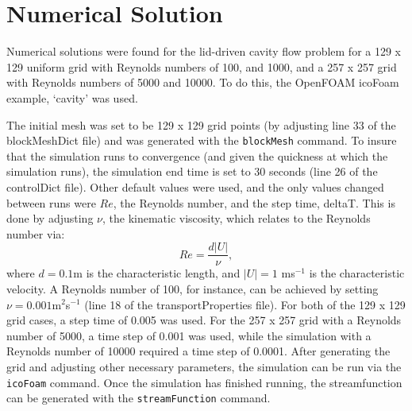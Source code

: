 \documentclass[twocolumn,10pt]{asme2ej}
\begin{document}
\section{Numerical Solution}
Numerical solutions were found for the lid-driven cavity flow problem for a 129 x 129 uniform grid with Reynolds numbers of 100, and 1000, and a 257 x 257 grid with Reynolds numbers of 5000 and 10000. To do this, the OpenFOAM icoFoam example, `cavity' was used.

The initial mesh was set to be 129 x 129 grid points (by adjusting line 33 of the blockMeshDict file) and was generated with the \lstinline[language=sh]`blockMesh` command. To insure that the simulation runs to convergence (and given the quickness at which the simulation runs), the simulation end time is set to 30 seconds (line 26 of the controlDict file). Other default values were used, and the only values changed between runs were $Re$, the Reynolds number, and the step time, deltaT. This is done by adjusting $\nu$, the kinematic viscosity, which relates to the Reynolds number via:
\begin{equation}
Re = \frac{d|U|}{\nu},
\end{equation}
where $d = 0.1$m is the characteristic length, and $|U| = 1$ ms$^{-1}$ is the characteristic velocity. A Reynolds number of 100, for instance, can be achieved by setting $\nu = 0.001$m$^2$s$^{-1}$ (line 18 of the transportProperties file). For both of the 129 x 129 grid cases, a step time of 0.005 was used. For the 257 x 257 grid with a Reynolds number of 5000, a time step of 0.001 was used, while the simulation with a Reynolds number of 10000 required a time step of 0.0001. After generating the grid and adjusting other necessary parameters, the simulation can be run via the \lstinline[language=sh]`icoFoam` command. Once the simulation has finished running, the streamfunction can be generated with the \lstinline[language=sh]`streamFunction` command.
\end{document}
